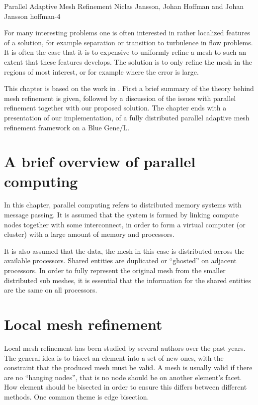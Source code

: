               {Parallel Adaptive Mesh Refinement}
              {Niclas Jansson, Johan Hoffman and Johan Jansson}
              {hoffman-4}

For many interesting problems one is often interested in rather
localized features of a solution, for example separation or transition
to turbulence in flow problems. It is often the case that it is to
expensive to uniformly refine a mesh to such an extent that these
features develops. The solution is to only refine the mesh in the
regions of most interest, or for example where the error is large.

This chapter is based on the work in \cite{Jansson2008}. First a brief
summary of the theory behind mesh refinement is given, followed by a
discussion of the issues with parallel refinement together with our
proposed solution. The chapter ends with a presentation of our
implementation, of a fully distributed parallel adaptive mesh
refinement framework on a Blue Gene/L.


\section{A brief overview of parallel computing}
\label{hoffman-4:sect:para}

In this chapter, parallel computing refers to distributed memory
systems with message passing. It is assumed that the system is formed
by linking compute nodes together with some interconnect, in order to
form a virtual computer (or cluster) with a large amount of memory and
processors.

It is also assumed that the data, the mesh in this case is distributed
across the available processors. Shared entities are duplicated or
``ghosted'' on adjacent processors. In order to fully represent the
original mesh from the smaller distributed sub meshes, it is essential
that the information for the shared entities are the same on all
processors.

\section{Local mesh refinement}

Local mesh refinement has been studied by several authors over the
past years. The general idea is to bisect an element into a set of new
ones, with the constraint that the produced mesh must be
valid. A mesh is usually valid if there are no ``hanging nodes'', that
is no node should be on another element's facet. How element should be
bisected in order to ensure this differs between different
methods. One common theme is edge bisection.

